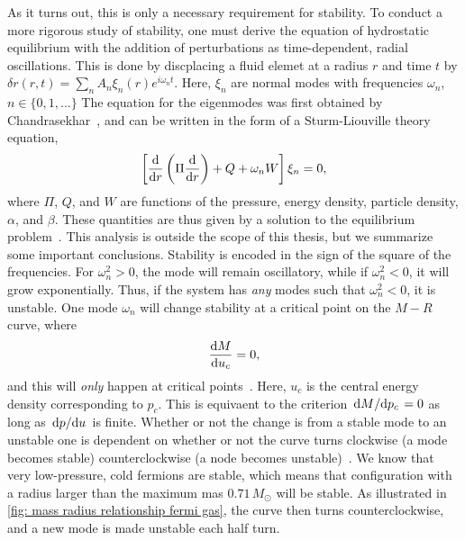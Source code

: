 As it turns out, this is only a necessary requirement for stability.
To conduct a more rigorous study of stability, one must derive the equation of hydrostatic equilibrium with the addition of perturbations as time-dependent, radial oscillations.
This is done by discplacing a fluid elemet at a radius $r$ and time $t$ by $\delta r(r, t) = \sum_n A_n \xi_n(r) e^{i \omega_n t}$.
Here, $\xi_n$ are normal modes with frequencies $\omega_n$, $n \in \{0, 1, ...\}$
The equation for the eigenmodes was first obtained by Chandrasekhar~\autocite{chandrasekharDynamicalInstabilityGaseous1964}, and can be written in the form of a Sturm-Liouville theory equation,
%
\begin{equation}
    \left[     \odv{}{r} \left( \Pi \odv{}{r}  \right) + Q + \omega_n W \right] \xi_n
    = 0,
\end{equation}
%
where $\Pi$, $Q$, and $W$ are functions of the pressure, energy density, particle density, $\alpha$, and $\beta$.
These quantities are thus given by a solution to the equilibrium problem~\cite{glendenningCompactStarsNuclear2012}.
This analysis is outside the scope of this thesis, but we summarize some important conclusions.
Stability is encoded in the sign of the square of the frequencies.
For $\omega_n^2>0$, the mode will remain oscillatory, while if $\omega_n^2<0$, it will grow exponentially.
Thus, if the system has \emph{any} modes such that $\omega_n^2<0$, it is unstable.
One mode $\omega_n$ will change stability at a critical point on the $M-R$ curve, where
%
\begin{equation}
    \odv{M}{u_c} = 0,
\end{equation}
%
and this will \emph{only} happen at critical points~\autocite{thorneGeneralRelativisticTheoryStellar1968}. Here, $u_c$ is the central energy density corresponding to $p_c$.
This is equivaent to the criterion $\odv{M}/{p_c} = 0$ as long as $\odv{p}/{u}$ is finite.
Whether or not the change is from a stable mode to an unstable one is dependent on whether or not the curve turns clockwise (a mode becomes stable) counterclockwise (a node becomes unstable)~\autocite{thorneGeneralRelativisticTheoryStellar1968}.
We know that very low-pressure, cold fermions are stable, which means that configuration with a radius larger than the maximum mas $0.71 \, M_\odot$ will be stable.
As illustrated in \autoref{fig: mass radius relationship fermi gas}, the curve then turns counterclockwise, and a new mode is made unstable each half turn.
